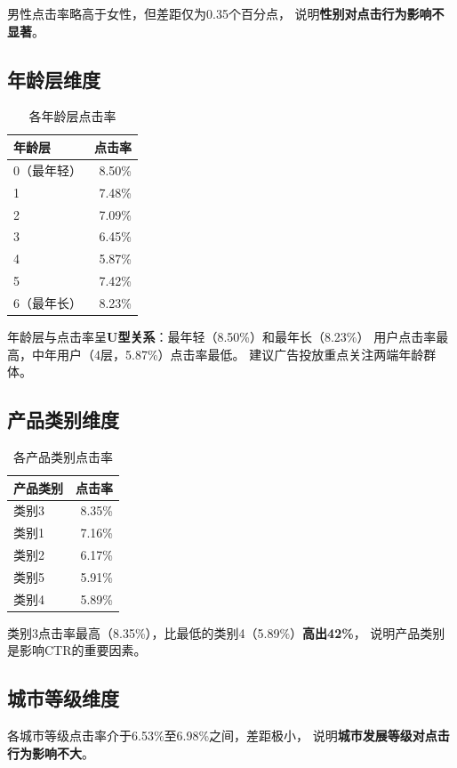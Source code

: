 \documentclass[12pt, a4paper]{article}
\begin{document}
男性点击率略高于女性，但差距仅为0.35个百分点，
说明\textbf{性别对点击行为影响不显著}。

\subsection{年龄层维度}
\begin{table}[h]
\centering
\caption{各年龄层点击率}
\begin{tabular}{lr}
\toprule
年龄层 & 点击率 \\
\midrule
0（最年轻） & 8.50\% \\
1 & 7.48\% \\
2 & 7.09\% \\
3 & 6.45\% \\
4 & 5.87\% \\
5 & 7.42\% \\
6（最年长） & 8.23\% \\
\bottomrule
\end{tabular}
\end{table}

年龄层与点击率呈\textbf{U型关系}：最年轻（8.50\%）和最年长（8.23\%）
用户点击率最高，中年用户（4层，5.87\%）点击率最低。
建议广告投放重点关注两端年龄群体。

\subsection{产品类别维度}
\begin{table}[h]
\centering
\caption{各产品类别点击率}
\begin{tabular}{lr}
\toprule
产品类别 & 点击率 \\
\midrule
类别3 & 8.35\% \\
类别1 & 7.16\% \\
类别2 & 6.17\% \\
类别5 & 5.91\% \\
类别4 & 5.89\% \\
\bottomrule
\end{tabular}
\end{table}

类别3点击率最高（8.35\%），比最低的类别4（5.89\%）\textbf{高出42\%}，
说明产品类别是影响CTR的重要因素。

\subsection{城市等级维度}
各城市等级点击率介于6.53\%至6.98\%之间，差距极小，
说明\textbf{城市发展等级对点击行为影响不大}。
\end{document}
